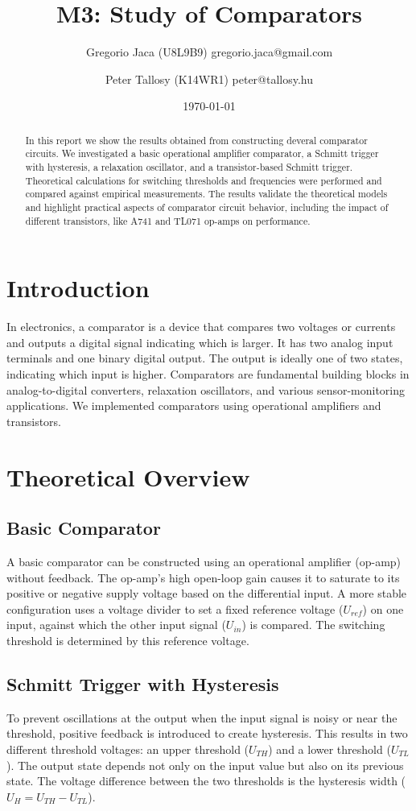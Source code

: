 \documentclass[12pt,a4paper]{article}
\title{M3: Study of Comparators}
\author{Gregorio Jaca (U8L9B9) gregorio.jaca@gmail.com \and Peter Tallosy (K14WR1) peter@tallosy.hu}
\date{\today}
\begin{document}
\maketitle

\begin{abstract}
In this report we show the results obtained from constructing deveral comparator circuits. We investigated a basic operational amplifier comparator, a Schmitt trigger with hysteresis, a relaxation oscillator, and a transistor-based Schmitt trigger. Theoretical calculations for switching thresholds and frequencies were performed and compared against empirical measurements. The results validate the theoretical models and highlight practical aspects of comparator circuit behavior, including the impact of different transistors, like \textmu A741 and TL071 op-amps on performance.
\end{abstract}

\section{Introduction}
In electronics, a comparator is a device that compares two voltages or currents and outputs a digital signal indicating which is larger. It has two analog input terminals and one binary digital output. The output is ideally one of two states, indicating which input is higher. Comparators are fundamental building blocks in analog-to-digital converters, relaxation oscillators, and various sensor-monitoring applications. We implemented comparators using operational amplifiers and transistors.

\section{Theoretical Overview}

\subsection{Basic Comparator}
A basic comparator can be constructed using an operational amplifier (op-amp) without feedback. The op-amp's high open-loop gain causes it to saturate to its positive or negative supply voltage based on the differential input. A more stable configuration uses a voltage divider to set a fixed reference voltage ($U_{ref}$) on one input, against which the other input signal ($U_{in}$) is compared. The switching threshold is determined by this reference voltage.

\subsection{Schmitt Trigger with Hysteresis}
To prevent oscillations at the output when the input signal is noisy or near the threshold, positive feedback is introduced to create hysteresis. This results in two different threshold voltages: an upper threshold ($U_{TH}$) and a lower threshold ($U_{TL}$). The output state depends not only on the input value but also on its previous state. The voltage difference between the two thresholds is the hysteresis width ($U_H = U_{TH} - U_{TL}$).
\end{document}
